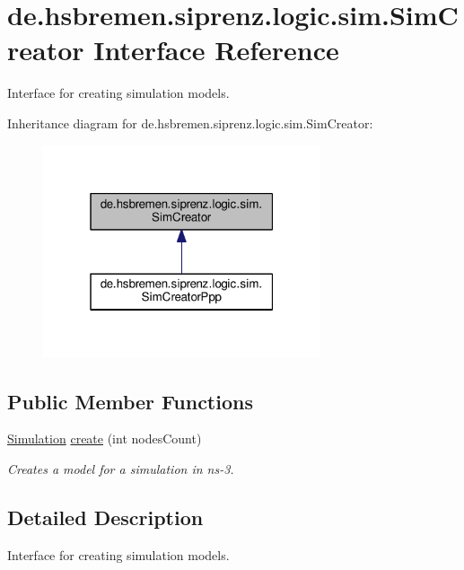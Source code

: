 \hypertarget{interfacede_1_1hsbremen_1_1siprenz_1_1logic_1_1sim_1_1SimCreator}{}\section{de.\+hsbremen.\+siprenz.\+logic.\+sim.\+Sim\+Creator Interface Reference}
\label{interfacede_1_1hsbremen_1_1siprenz_1_1logic_1_1sim_1_1SimCreator}


Interface for creating simulation models.  




Inheritance diagram for de.\+hsbremen.\+siprenz.\+logic.\+sim.\+Sim\+Creator\+:\nopagebreak
\begin{figure}[H]
\begin{center}
\leavevmode
\includegraphics[width=232pt]{interfacede_1_1hsbremen_1_1siprenz_1_1logic_1_1sim_1_1SimCreator__inherit__graph}
\end{center}
\end{figure}
\subsection*{Public Member Functions}
\begin{DoxyCompactItemize}
\item 
\hyperlink{classde_1_1hsbremen_1_1siprenz_1_1model_1_1xml_1_1Simulation}{Simulation} \hyperlink{interfacede_1_1hsbremen_1_1siprenz_1_1logic_1_1sim_1_1SimCreator_af31c0bd004b2b100d9fd2e413cdaeac0}{create} (int nodes\+Count)
\begin{DoxyCompactList}\small\item\em Creates a model for a simulation in ns-\/3. \end{DoxyCompactList}\end{DoxyCompactItemize}


\subsection{Detailed Description}
Interface for creating simulation models. 

